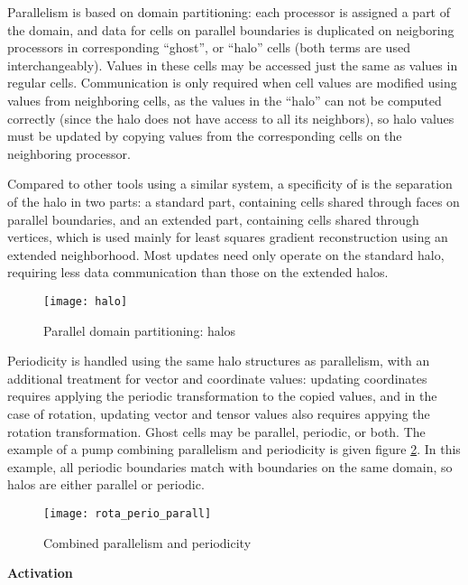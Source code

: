 {{{%

Parallelism is based on domain partitioning: each processor is assigned
a part of the domain, and data for cells on parallel boundaries
is duplicated on neigboring processors in corresponding ``ghost'',
or ``halo'' cells (both terms are used interchangeably). Values in
these cells may be accessed just the same as values in regular cells.
Communication is only required when cell values are modified
using values from neighboring cells, as the values in the ``halo'' can
not be computed correctly (since the halo does not have access to all
its neighbors), so halo values must be updated by copying values from
the corresponding cells on the neighboring processor.

Compared to other tools using a similar system, a specificity of
\CS is the separation of the halo in two parts: a standard part,
containing cells shared through faces on parallel boundaries, and an
extended part, containing cells shared through vertices, which is
used mainly for least squares gradient reconstruction using an
extended neighborhood. Most updates need only operate on the standard
halo, requiring less data communication than those on the extended halos.

\begin{figure}[!h]
\centerline{
\texttt{[image: halo]}}
\caption{Parallel domain partitioning: halos}\label{Fig_haluile}
\end{figure}

Periodicity is handled using the same halo structures as parallelism,
with an additional treatment for vector and coordinate values: updating
coordinates requires applying the periodic transformation to the copied
values, and in the case of rotation, updating vector and tensor values
also requires appying the rotation transformation.
Ghost cells may be parallel, periodic, or both. The example of a pump
combining parallelism and periodicity is given figure \ref{Fig_parperio_pump}.
In this example, all periodic boundaries match with boundaries on
the same domain, so halos are either parallel or periodic.

\begin{figure}[!h]
\centerline{
\texttt{[image: rota\_perio\_parall]}}
\caption{Combined parallelism and periodicity}\label{Fig_parperio_pump}
\end{figure}

\label{prg_paralperio}
{\bf Activation}

}}}
